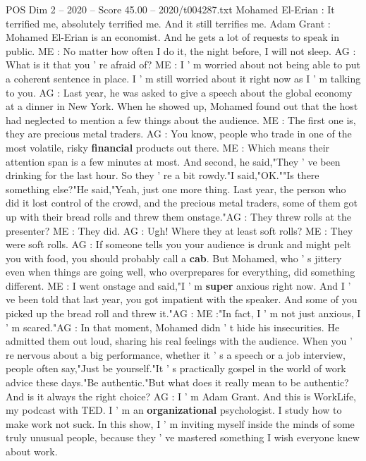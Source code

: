 \begin{textsample}{POS Dim 2 – 2020 – Score 45.00 – 2020/t004287.txt}  \label{ex:f2_pos_006}
Mohamed El-Erian : It terrified me, absolutely terrified me.
And it still terrifies me.
Adam Grant : Mohamed El-Erian is an economist.
And he gets a lot of requests to speak in public.
ME : No matter how often I do it, the night before, I will not sleep.
AG : What is it that you ' re afraid of?
ME : I ' m worried about not being able to put a coherent sentence in place.
I ' m still worried about it right now as I ' m talking to you.
AG : Last year, he was asked to give a speech about the global economy at a dinner in New York.
When he showed up, Mohamed found out that the host had neglected to mention a few things about the audience.
ME : The first one is, they are precious metal traders.
AG : You know, people who trade in one of the most volatile, risky \textbf{financial} products out there.
ME : Which means their attention span is a few minutes at most.
And second, he said,"They ' ve been drinking for the last hour.
So they ' re a bit rowdy."I said,"OK.""Is there something else?"He said,"Yeah, just one more thing.
Last year, the person who did it lost control of the crowd, and the precious metal traders, some of them got up with their bread rolls and threw them onstage."AG : They threw rolls at the presenter?
ME : They did.
AG : Ugh!
Where they at least soft rolls?
ME : They were soft rolls.
AG : If someone tells you your audience is drunk and might pelt you with food, you should probably call a \textbf{cab}.
But Mohamed, who ' s jittery even when things are going well, who overprepares for everything, did something different.
ME : I went onstage and said,"I ' m \textbf{super} anxious right now.
And I ' ve been told that last year, you got impatient with the speaker.
And some of you picked up the bread roll and threw it."AG : ME :"In fact, I ' m not just anxious, I ' m scared."AG : In that moment, Mohamed didn ' t hide his insecurities.
He admitted them out loud, sharing his real feelings with the audience.
When you ' re nervous about a big performance, whether it ' s a speech or a job interview, people often say,"Just be yourself."It ' s practically gospel in the world of work advice these days."Be authentic."But what does it really mean to be authentic?
And is it always the right choice?
AG : I ' m Adam Grant.
And this is WorkLife, my podcast with TED.
I ' m an \textbf{organizational} psychologist.
I study how to make work not suck.
In this show, I ' m inviting myself inside the minds of some truly unusual people, because they ' ve mastered something I wish everyone knew about work.

\end{textsample}
